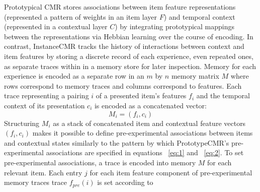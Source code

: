 {}Prototypical CMR stores associations between item feature representations (represented a pattern of weights in an item layer $F$) and temporal context (represented in a contextual layer $C$) by integrating prototypical mappings between the representations via Hebbian learning over the course of encoding. In contrast, InstanceCMR tracks the history of interactions between context and item features by storing a discrete record of each experience, even repeated ones, as separate traces within in a memory store for later inspection. Memory for each experience is encoded as a separate row in an $m$ by $n$ memory matrix $M$ where rows correspond to memory traces and columns correspond to features. Each trace representing a pairing $i$ of a presented item’s features $f_i$ and the temporal context of its presentation $c_i$ is encoded as a concatenated vector:\markdownRendererInterblockSeparator
{}\begin{equation} \label{eq:14}M_i = (f_i, c_i)\end{equation}\markdownRendererInterblockSeparator
{}\markdownRendererInterblockSeparator
{}Structuring $M_i$ as a stack of concatenated item and contextual feature vectors $(f_i, c_i)$ makes it possible to define pre-experimental associations between items and contextual states similarly to the pattern by which PrototypeCMR's pre-experimental associations are specified in equations ~\ref{eq:1} and ~\ref{eq:2}. To set pre-experimental associations, a trace is encoded into memory $M$ for each relevant item. Each entry $j$ for each item feature component of pre-experimental memory traces trace $f_{pre}(i)$ is set according to\relax